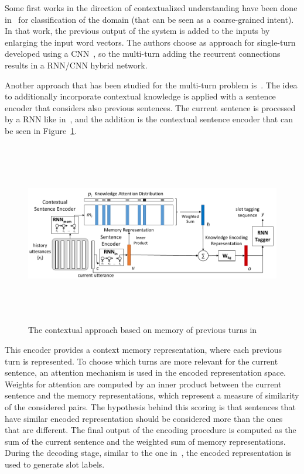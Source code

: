 Some first works in the direction of contextualized understanding have been done in~\cite{xu2014contextual} for classification of the domain (that can be seen as a coarse-grained intent). In that work, the previous output of the system is added to the inputs by enlarging the input word vectors. The authors choose as approach for single-turn developed using a  CNN~\cite{krizhevsky2012imagenet}, so the multi-turn adding the recurrent connections results in a RNN/CNN hybrid network.

Another approach that has been studied for the multi-turn problem is~\cite{chen2016end}. The idea to additionally incorporate contextual knowledge is applied with a sentence encoder that considers also previous sentences. The current sentence is processed by a RNN like in~\cite{liu2016attention}, and the addition is the contextual sentence encoder that can be seen in Figure~\ref{fig:contextualSLUchen}.

\begin{figure}[!htb]
    \centering
    \includegraphics[max width=0.9\linewidth,max height=8cm,keepaspectratio]{figures/contextualSLUchen}
    \caption{The contextual approach based on memory of previous turns in~\cite{chen2016end}}\label{fig:contextualSLUchen}
\end{figure}

This encoder provides a context memory representation, where each previous turn is represented. To choose which turns are more relevant for the current sentence, an attention mechanism is used in the encoded representation space. Weights for attention are computed by an inner product between the current sentence and the memory representations, which represent a measure of similarity of the considered pairs. The hypothesis behind this scoring is that sentences that have similar encoded representation should be considered more than the ones that are different. The final output of the encoding procedure is computed as the sum of the current sentence and the weighted sum of memory representations. During the decoding stage, similar to the one in~\cite{cho2014learning}, the encoded representation is used to generate slot labels.

